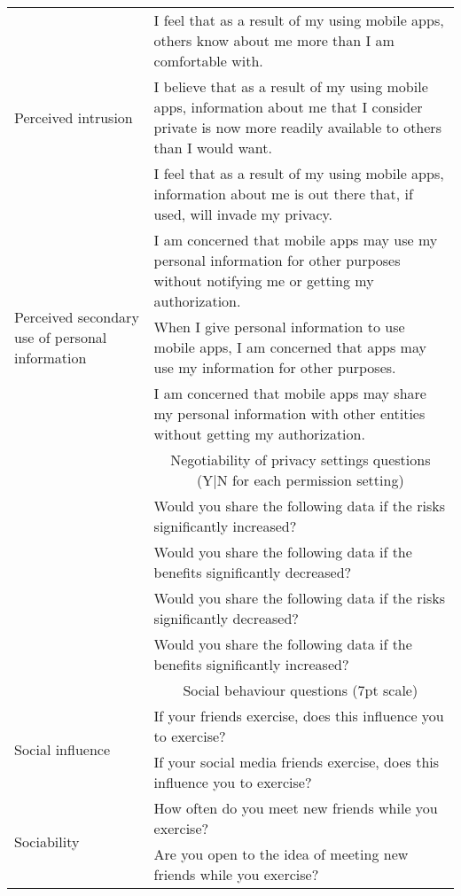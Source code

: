 \begin{appendices}
\begin{table}[h]
\begin{tabular}{m{2cm}m{14cm}}
\multirow{3}{2cm}{Perceived intrusion}
& I feel that as a result of my using mobile apps, others know about me more than I am comfortable with.\\
& I believe that as a result of my using mobile apps, information about me that I consider private is now more readily available to others than I would want.\\
& I feel that as a result of my using mobile apps, information about me is out there that, if used, will invade my privacy.\\

\cmidrule(r){2-2}


\multirow{3}{2cm}{Perceived secondary use of personal information}
& I am concerned that mobile apps may use my personal information for other purposes without notifying me or getting my authorization.\\
& When I give personal information to use mobile apps, I am concerned that apps may use my information for other purposes.\\
& I am concerned that mobile apps may share my personal information with other entities without getting my authorization.\\
\hline

 & \multicolumn{1}{c}{Negotiability of privacy settings questions (Y|N for each permission setting)} \\
 \cmidrule(r){2-2}
& Would you share the following data if the risks significantly increased?\\
& Would you share the following data if the benefits significantly decreased?\\
& Would you share the following data if the risks significantly decreased?\\
& Would you share the following data if the benefits significantly increased?\\
\hline

 & \multicolumn{1}{c}{Social behaviour questions (7pt scale)} \\
\cmidrule(r){2-2}
\multirow{2}{2cm}{Social influence}
& If your friends exercise, does this influence you to exercise?\\
& If your social media friends exercise, does this influence you to exercise?\\
\cmidrule(r){2-2}

\multirow{2}{2cm}{Sociability}
& How often do you meet new friends while you exercise?\\
& Are you open to the idea of meeting new friends while you exercise?\\
\hline


\end{tabular}
\end{table}
\end{appendices}
